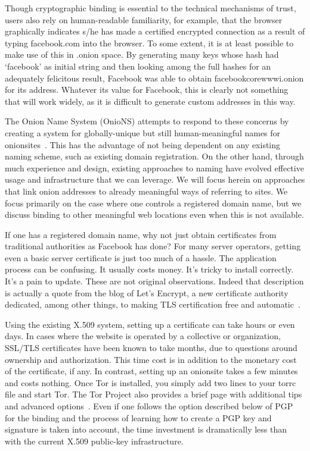 \documentclass[10pt, conference, compsocconf]{styles/IEEEtran}
\begin{document}
Though cryptographic binding is essential to the technical mechanisms
of trust, users also rely on human-readable familiarity, for example,
that the browser graphically indicates s/he has made a certified
encrypted connection as a result of typing facebook.com into the
browser.  To some extent, it is at least possible to make use of this
in .onion space. By generating many keys whose hash had `facebook' as
initial string and then looking among the full hashes for an
adequately felicitous result, Facebook was able to obtain
facebookcorewwwi.onion for its address. Whatever its value for
Facebook, this is clearly not something that will work widely, as it
is difficult to generate custom addresses in this way. 

The Onion Name System (OnioNS) attempts to respond to these concerns
by creating a system for globally-unique but still human-meaningful
names for onionsites~\cite{vickers-onions}.  This has the advantage of
not being dependent on any existing naming scheme, such as existing
domain registration. On the other hand, through much experience and
design, existing approaches to naming have evolved effective usage and
infrastructure that we can leverage. We will focus herein on
approaches that link onion addresses to already meaningful ways of
referring to sites. We focus primarily on the case where one controls
a registered domain name, but we discuss binding to other meaningful
web locations even when this is not available.

If one has a registered domain name,
why not just obtain certificates from traditional authorities as
Facebook has done? For many server operators, getting
even a basic server certificate is just too much of a hassle. The
application process can be confusing. It usually costs money. It's
tricky to install correctly. It's a pain to update. 
These are not original observations. Indeed that description is
actually a quote from the blog of Let's Encrypt, a new certificate
authority dedicated, among other things, to making TLS certification
free and automatic~\cite{lets-encrypt}.

Using the existing X.509 system, setting up a certificate can take
hours or even days. In cases where the website is operated by a
collective or organization, SSL/TLS certificates have been known to
take months, due to questions around ownership and authorization.
This time cost is in addition to the monetary cost of the certificate, if any.
In contrast, setting up an onionsite takes a few minutes and costs
nothing. Once Tor is installed, you simply add two lines to your torrc file 
and start Tor. The Tor Project also provides a brief page with
additional tips and advanced options~\cite{hs-config}.  Even if
one follows the option described below of PGP for the binding and the process
of learning how to create a PGP key and signature is taken into
account, the time investment is dramatically less than with the
current X.509 public-key infrastructure.
\end{document}
